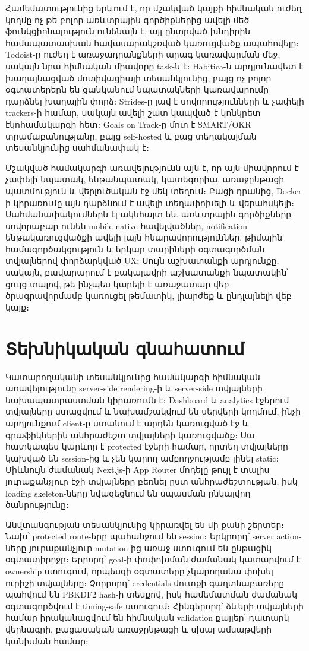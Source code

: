 Համեմատությունից երևում է, որ մշակված կայքի հիմնական ուժեղ կողմը ոչ թե բոլոր առևտրային գործիքներից ավելի մեծ ֆունկցիոնալություն ունենալն է, այլ ընտրված խնդիրին համապատասխան հավասարակշռված կառուցվածք ապահովելը։ Todoist-ը ուժեղ է առաջադրանքների արագ կառավարման մեջ, սակայն նրա հիմնական միավորը task-ն է։ Habitica-ն արդյունավետ է խաղայնացված մոտիվացիայի տեսանկյունից, բայց ոչ բոլոր օգտատերերն են ցանկանում նպատակների կառավարումը դարձնել խաղային փորձ։ Strides-ը լավ է սովորությունների և չափելի trackers-ի համար, սակայն ավելի շատ կապված է կոնկրետ էկոհամակարգի հետ։ Goals on Track-ը մոտ է SMART/OKR տրամաբանությանը, բայց self-hosted և բաց տեղակայման տեսանկյունից սահմանափակ է։

Մշակված համակարգի առավելությունն այն է, որ այն միավորում է չափելի նպատակ, ենթանպատակ, կատեգորիա, առաջընթացի պատմություն և վերլուծական էջ մեկ տեղում։ Բացի դրանից, Docker-ի կիրառումը այն դարձնում է ավելի տեղափոխելի և վերահսկելի։ Սահմանափակումներն էլ ակնհայտ են. առևտրային գործիքները սովորաբար ունեն mobile native հավելվածներ, notification ենթակառուցվածքի ավելի լայն հնարավորություններ, թիմային համագործակցություն և երկար տարիների օգտագործման տվյալներով փորձարկված UX։ Սույն աշխատանքի արդյունքը, սակայն, բավարարում է բակալավրի աշխատանքի նպատակին՝ ցույց տալով, թե ինչպես կարելի է առաջատար վեբ ծրագրավորմամբ կառուցել թեմատիկ, լիարժեք և ընդլայնելի վեբ կայք։

\section{Տեխնիկական գնահատում}

Կատարողականի տեսանկյունից համակարգի հիմնական առավելությունը server-side rendering-ի և server-side տվյալների նախապատրաստման կիրառումն է։ Dashboard և analytics էջերում տվյալները ստացվում և նախամշակվում են սերվերի կողմում, ինչի արդյունքում client-ը ստանում է արդեն կառուցված էջ և գրաֆիկներին անհրաժեշտ տվյալների կառուցվածք։ Սա հատկապես կարևոր է protected էջերի համար, որտեղ տվյալները կախված են session-ից և չեն կարող ամբողջությամբ լինել static։ Միևնույն ժամանակ Next.js-ի App Router մոդելը թույլ է տալիս յուրաքանչյուր էջի տվյալները բեռնել ըստ անհրաժեշտության, իսկ loading skeleton-ները նվազեցնում են սպասման ընկալվող ծանրությունը։

Անվտանգության տեսանկյունից կիրառվել են մի քանի շերտեր։ Նախ՝ protected route-երը պահանջում են session։ Երկրորդ՝ server action-ները յուրաքանչյուր mutation-ից առաջ ստուգում են ընթացիկ օգտատիրոջը։ Երրորդ՝ goal-ի փոփոխման ժամանակ կատարվում է ownership ստուգում, որպեսզի օգտատերը չկարողանա փոխել ուրիշի տվյալները։ Չորրորդ՝ credentials մուտքի գաղտնաբառերը պահվում են PBKDF2 hash-ի տեսքով, իսկ համեմատման ժամանակ օգտագործվում է timing-safe ստուգում։ Հինգերորդ՝ ձևերի տվյալների համար իրականացվում են հիմնական validation քայլեր՝ դատարկ վերնագրի, բացասական առաջընթացի և սխալ ամսաթվերի կանխման համար։

